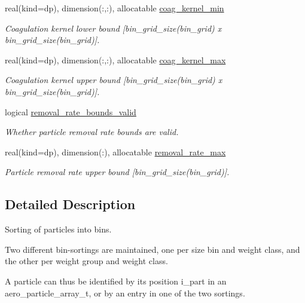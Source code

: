 \begin{DoxyCompactItemize}
real(kind=dp), dimension(\+:,\+:), allocatable \mbox{\hyperlink{structpmc__aero__sorted_1_1aero__sorted__t_ac65ea636b68c3d2717b20288bb8142c3}{coag\+\_\+kernel\+\_\+min}}
\begin{DoxyCompactList}\small\item\em Coagulation kernel lower bound \mbox{[}{\ttfamily bin\+\_\+grid\+\_\+size(bin\+\_\+grid) x bin\+\_\+grid\+\_\+size(bin\+\_\+grid)}\mbox{]}. \end{DoxyCompactList}\item 
real(kind=dp), dimension(\+:,\+:), allocatable \mbox{\hyperlink{structpmc__aero__sorted_1_1aero__sorted__t_a94dc9faf9bcc17ffb2d02ca9b0a5b04f}{coag\+\_\+kernel\+\_\+max}}
\begin{DoxyCompactList}\small\item\em Coagulation kernel upper bound \mbox{[}{\ttfamily bin\+\_\+grid\+\_\+size(bin\+\_\+grid) x bin\+\_\+grid\+\_\+size(bin\+\_\+grid)}\mbox{]}. \end{DoxyCompactList}\item 
logical \mbox{\hyperlink{structpmc__aero__sorted_1_1aero__sorted__t_aced0affcf4290ecdaf8e9b7dbb221ee8}{removal\+\_\+rate\+\_\+bounds\+\_\+valid}}
\begin{DoxyCompactList}\small\item\em Whether particle removal rate bounds are valid. \end{DoxyCompactList}\item 
real(kind=dp), dimension(\+:), allocatable \mbox{\hyperlink{structpmc__aero__sorted_1_1aero__sorted__t_aace29ce6a2e834ba7a7d1730f00e96d7}{removal\+\_\+rate\+\_\+max}}
\begin{DoxyCompactList}\small\item\em Particle removal rate upper bound \mbox{[}{\ttfamily bin\+\_\+grid\+\_\+size(bin\+\_\+grid)}\mbox{]}. \end{DoxyCompactList}\end{DoxyCompactItemize}


\subsection{Detailed Description}
Sorting of particles into bins. 

Two different bin-\/sortings are maintained, one per size bin and weight class, and the other per weight group and weight class.

A particle can thus be identified by its position {\ttfamily i\+\_\+part} in an {\ttfamily aero\+\_\+particle\+\_\+array\+\_\+t}, or by an entry in one of the two sortings.

